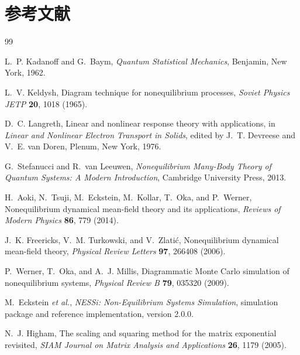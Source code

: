 \chapter{参考文献}
\label{app:references}

\begin{thebibliography}{99}

L.~P. Kadanoff and G.~Baym,
\newblock \emph{Quantum Statistical Mechanics},
\newblock Benjamin, New York, 1962.

L.~V. Keldysh,
\newblock Diagram technique for nonequilibrium processes,
\newblock \emph{Soviet Physics JETP} \textbf{20}, 1018 (1965).

D.~C. Langreth,
\newblock Linear and nonlinear response theory with applications,
\newblock in \emph{Linear and Nonlinear Electron Transport in Solids},
edited by J.~T. Devreese and V.~E. van Doren,
Plenum, New York, 1976.

G.~Stefanucci and R.~van Leeuwen,
\newblock \emph{Nonequilibrium Many-Body Theory of Quantum Systems:
A Modern Introduction},
\newblock Cambridge University Press, 2013.

H.~Aoki, N.~Tsuji, M.~Eckstein, M.~Kollar, T.~Oka, and P.~Werner,
\newblock Nonequilibrium dynamical mean-field theory and its applications,
\newblock \emph{Reviews of Modern Physics} \textbf{86}, 779 (2014).

J.~K. Freericks, V.~M. Turkowski, and V.~Zlati\'c,
\newblock Nonequilibrium dynamical mean-field theory,
\newblock \emph{Physical Review Letters} \textbf{97}, 266408 (2006).

P.~Werner, T.~Oka, and A.~J. Millis,
\newblock Diagrammatic Monte Carlo simulation of nonequilibrium systems,
\newblock \emph{Physical Review B} \textbf{79}, 035320 (2009).

M.~Eckstein \emph{et al.},
\newblock \emph{NESSi: Non-Equilibrium Systems Simulation},
\newblock simulation package and reference implementation, version 2.0.0.

N.~J. Higham,
\newblock The scaling and squaring method for the matrix exponential
revisited,
\newblock \emph{SIAM Journal on Matrix Analysis and Applications}
\textbf{26}, 1179 (2005).


\end{thebibliography}

